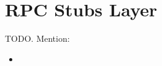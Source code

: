 \section{RPC Stubs Layer} %
\label{sec:rpc_stubs_layer}
TODO. Mention:
\begin{itemize}
	\item 
\end{itemize}
